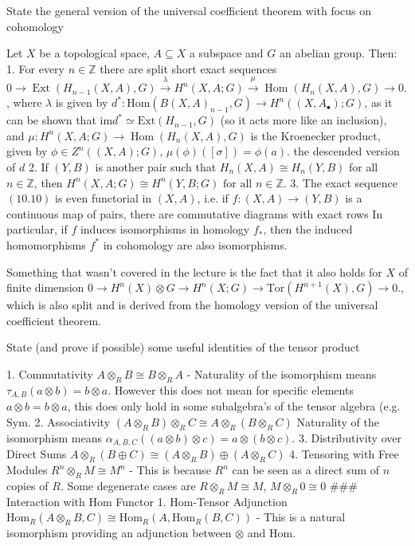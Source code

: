 State the general version of the universal coefficient theorem with focus on cohomology

Let \(X\) be a topological space, \(A \subseteq X\) a subspace and \(G\) an abelian group. Then:
1. For every \(n \in \mathbb{Z}\) there are split short exact sequences
\(0 \longrightarrow \operatorname{Ext}(H_{n-1}(X, A), G) \xrightarrow{\lambda} H^n(X, A; G) \xrightarrow{\mu} \operatorname{Hom}(H_n(X, A), G) \longrightarrow 0.\),
where \( \lambda \) is given by \( d^\ast : \text{Hom}(B(X, A)_{n-1}, G) \to H^n((X, A_\bullet);G) \), as it can be shown that \( \text{im} d^\ast \simeq \text{Ext}(H_{n-1}, G)\) (so it acts more like an inclusion), and \( \mu : H^n(X, A; G) \to \operatorname{Hom}(H_n(X, A), G) \) is the Kroenecker product, given by \( \phi \in Z^n((X, A);G) \), \( \mu(\phi)([\sigma]) = \phi(a) \).
the descended version of \( d \)
2. If \((Y, B)\) is another pair such that \(H_n(X, A) \cong H_n(Y, B)\) for all \(n \in \mathbb{Z}\), then 
\(
H^n(X, A; G) \cong H^n(Y, B; G) \text{ for all } n \in \mathbb{Z}.
\)
3. The exact sequence \((10.10)\) is even functorial in \((X, A)\), i.e. if \(f : (X, A) \rightarrow (Y, B)\) is a continuous map of pairs, there are commutative diagrams with exact rows
In particular, if \(f\) induces isomorphisms in homology \(f_*\), then the induced homomorphisms \(f^*\) in cohomology are also isomorphisms.

Something that wasn't covered in the lecture is the fact that it also holds for \( X \) of finite dimension
\(0 \longrightarrow H^n(X) \otimes G \longrightarrow H^n(X;G) \longrightarrow \text{Tor}(H^{n+1}(X), G) \to 0.\),
which is also split and is derived from the homology version of the universal coefficient theorem.



State (and prove if possible) some useful identities of the tensor product

1. 
Commutativity
\(
A \otimes_R B \cong B \otimes_R A
\)
- Naturality of the isomorphism means \( \tau_{A, B}(a \otimes b) = b \otimes a \).
However this does not mean for specific elements \( a \otimes b = b \otimes a \), this does only
hold in some subalgebra's of the tensor algebra (e.g. \( \text{Sym} \).
2. Associativity
\(
(A \otimes_R B) \otimes_R C \cong A \otimes_R (B \otimes_R C)
\)
 Naturality of the isomorphism means \(\alpha_{A, B, C}((a \otimes b) \otimes c) = a \otimes (b \otimes c)\).
3. Distributivity over Direct Sums
\(
A \otimes_R (B \oplus C) \cong (A \otimes_R B) \oplus (A \otimes_R C)
\)
4. Tensoring with Free Modules
\(
R^n \otimes_R M \cong M^n
\)
- This is because \(R^n\) can be seen as a direct sum of \(n\) copies of \(R\).
Some degenerate cases are \( R \otimes_R M \cong M \), \( M \otimes_R 0 \cong 0 \)
### Interaction with Hom Functor
1. Hom-Tensor Adjunction
\(
\text{Hom}_R(A \otimes_R B, C) \cong \text{Hom}_R(A, \text{Hom}_R(B, C))
\)
- This is a natural isomorphism providing an adjunction between \(\otimes\) and \(\text{Hom}\).

